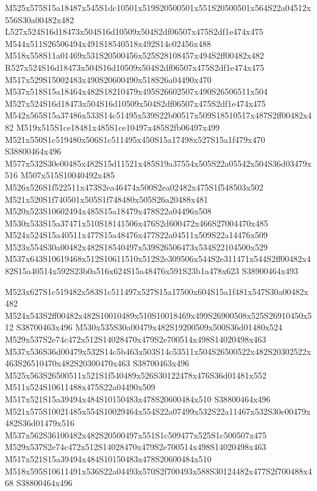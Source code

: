 \documentclass{article}
\begin{document}
\begin{multicols}{2}
M525x575S15a18487x545S1dc10501x519S20500501x551S20500501x564S22a04512x556S30a00482x482 L527x524S16d18473x504S16d10509x504S2df06507x475S2df1e474x475 M544x511S26506494x491S18540518x492S14c02456x488 M518x558S11a01469x531S20500456x525S28108457x494S2ff00482x482 R527x524S16d18473x504S16d10509x504S2df06507x475S2df1e474x475 M517x529S15002483x490S20600490x518S26a04490x470 M537x518S15a18464x482S18210479x495S26602507x490S26506511x504 M527x524S16d18473x504S16d10509x504S2df06507x475S2df1e474x475 M542x565S15a37486x533S14c51495x539S22b00517x509S18510517x487S2ff00482x482 M519x515S1ce18481x485S1ce10497x485S2fb06497x499 M521x550S1c519480x506S1c511495x450S15a17498x527S15a1f479x470 S38800464x496 M577x532S30e00485x482S15d11521x485S19a37554x505S22a05542x504S36d03479x516 M507x515S10040492x485 M526x526S1f522511x473S2ea46474x500S2ea02482x475S1f548503x502 M521x520S1f740501x505S1f748480x505S26a20488x481 M520x523S10602494x485S15a18479x478S22a04496x508 M530x533S15a37471x510S18141506x476S2d600472x466S27004470x485 M524x524S15a40511x477S15a48476x477S22a04511x509S22a14476x509 M523x554S30a00482x482S18540497x539S26506473x534S22104500x529 M537x643S10619468x512S10611510x512S2e309506x544S2e311471x544S2ff00482x482S15a40514x592S23b0a516x624S15a48476x591S23b1a478x623 S38900464x493

M523x627S1c519482x583S1c511497x527S15a17500x604S15a1f481x547S30a00482x482 M524x543S2ff00482x482S10010489x510S10018469x499S26900508x525S26910450x512 S38700463x496 M530x535S30a00479x482S19200509x500S36d01480x524 M529x537S2e74c472x512S14028470x479S2e700514x498S14020498x463 M537x536S36d00479x532S14c5b463x503S14c53511x504S26500522x482S20302522x463S26510470x482S20300470x463 S38700463x496 M525x563S26500511x521S1f540489x526S30122478x476S36d01481x552 M511x524S10611488x475S22a04490x509 M517x521S15a39494x484S10150483x478S20600484x510 S38800464x496 M521x575S10021485x554S10029464x554S22a07499x532S22a11467x532S30e00479x482S36d01479x516 M537x562S36100482x482S20500497x551S1c509477x525S1c500507x475 M529x537S2e74c472x512S14028470x479S2e700514x498S14020498x463 M517x521S15a39494x484S10150483x478S20600484x510 M518x595S10611491x536S22a04493x570S2f700493x588S30124482x477S2f700488x468 S38800464x496




\end{multicols}
\end{document}
